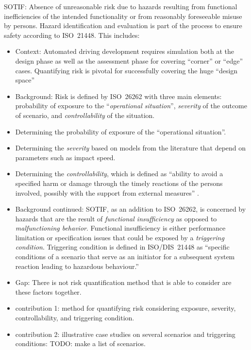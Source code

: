 SOTIF: Absence of unreasonable risk due to hazards resulting from functional inefficiencies of the intended functionality or from reasonably foreseeable misuse by persons.
Hazard identification and evaluation is part of the process to ensure safety according to ISO~21448.
This includes:
\begin{itemize}
    \item Context: 
    Automated driving development requires simulation both at the design phase as well as the assessment phase for covering ``corner'' or ``edge'' cases. 
    Quantifying risk is pivotal for successfully covering the huge ``design space''
    \item Background: 
    Risk is defined by ISO~26262 with three main elements: probability of exposure to the ``\textit{operational situation}'', \textit{severity} of the outcome of scenario, and \textit{controllability} of the situation. 
    \item Determining the probability of exposure of the ``operational situation''.
    \item Determining the \textit{severity} based on models from the literature that depend on parameters such as impact speed. 
    \item Determining the \emph{controllability}, which is defined as ``ability to avoid a specified harm or damage through the timely reactions of the persons involved, possibly with the support from external measures'' \autocite{ISO26262}.
    \item Background continued: SOTIF, as an addition to ISO~26262, is concerned by hazards that are the result of \textit{functional insufficiency} as opposed to \textit{malfunctioning behavior}. Functional insufficiency is either performance limitation or specification issues that could be exposed by a \textit{triggering condition}. Triggering condition is defined in ISO/DIS~21448 as ``specific conditions of a scenario that serve as an initiator for a subsequent system reaction leading to hazardous behaviour.'' 
    
    
    \item Gap: There is not risk quantification method that is able to consider are these factors together. 
    
    \item contribution 1: method for quantifying risk considering exposure, severity, controllability, and triggering condition. 
    \item contribution 2: illustrative case studies on several scenarios and triggering conditions: 
    TODO: make a list of scenarios. 
    
    

\end{itemize}
